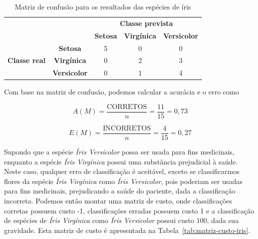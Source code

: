 \begin{table}[h]
	\centering
	
	\begin{tabular}{cc|c|c|c|}
		\cline{3-5}
		                                                            &                     &       \multicolumn{3}{c|}{\textbf{Classe prevista}}        \\ \cline{3-5}
		                                                            &                     & \textbf{Setosa} & \textbf{Virgínica} & \textbf{Versicolor} \\ \hline
		\multicolumn{1}{|c|}{\multirow{3}{*}{\textbf{Classe real}}} &   \textbf{Setosa}   &        5        &         0          &          0          \\ \cline{2-5}
		                  \multicolumn{1}{|c|}{}                    & \textbf{Virgínica}  &        0        &         2          &          3          \\ \cline{2-5}
		                  \multicolumn{1}{|c|}{}                    & \textbf{Versicolor} &        0        &         1          &          4          \\ \hline
	\end{tabular}
	
	\caption{Matriz de confusão para os resultados das espécies de íris}
	\label{tab:matriz-confusao-iris}
\end{table}

Com base na matriz de confusão, podemos calcular a acurácia e o erro como

$$
A(M) = \frac{\text{CORRETOS}}{n} = \frac{11}{15} = 0,73
$$

$$
E(M) = \frac{\text{INCORRETOS}}{n} = \frac{4}{15} = 0,27
$$

Supondo que a espécie \textit{Íris Versicolor} possa ser usada para fins medicinais, enquanto a espécie \textit{Íris Virgínica} possui uma substância prejudicial à saúde. Neste caso, qualquer erro de classificação é aceitável, exceto se classificarmos flores da espécie \textit{Íris Virgínica} como \textit{Íris Versicolor}, pois poderiam ser usadas para fins medicinais, prejudicando a saúde do paciente, dada a classificação incorreta. Podemos então montar uma matriz de custo, onde classificações corretas possuem custo -1, classificações erradas possuem custo 1 e a classificação de espécies de \textit{Íris Virgínica} como \textit{Íris Versicolor} possui custo 100, dada sua gravidade. Esta matriz de custo é apresentada na Tabela~\ref{tab:matriz-custo-iris}.

